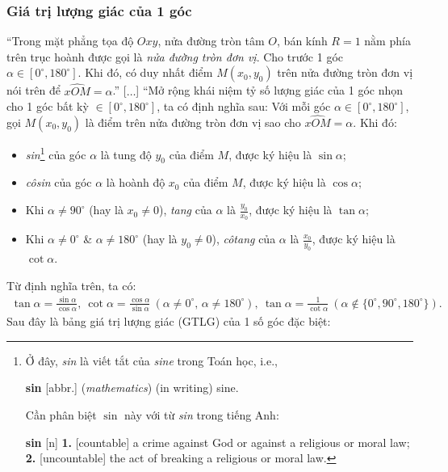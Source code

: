 \documentclass{article}
\numberwithin{equation}{section}
\begin{document}
\subsubsection{Giá trị lượng giác của 1 góc}
``Trong mặt phẳng tọa độ $Oxy$, nửa đường tròn tâm $O$, bán kính $R = 1$ nằm phía trên trục hoành được gọi là \textit{nửa đường tròn đơn vị}. Cho trước 1 góc $\alpha\in[0^\circ,180^\circ]$. Khi đó, có duy nhất điểm $M(x_0,y_0)$ trên nửa đường tròn đơn vị nói trên để $\widehat{xOM} = \alpha$.'' [$\ldots$] ``Mở rộng khái niệm tỷ số lượng giác của 1 góc nhọn cho 1 góc bất kỳ $\in[0^\circ,180^\circ]$, ta có định nghĩa sau: Với mỗi góc $\alpha\in[0^\circ,180^\circ]$, gọi $M(x_0,y_0)$ là điểm trên nửa đường tròn đơn vị sao cho $\widehat{xOM} = \alpha$. Khi đó:
\begin{itemize}
	\item \textit{sin}\footnote{Ở đây, \textit{sin} là viết tắt của \textit{sine} trong Toán học, i.e.,
		
		 \textbf{sin} [abbr.] (\textit{mathematics}) (in writing) sine.
		 
		 Cần phân biệt $\sin$ này với từ \textit{sin} trong tiếng Anh:
	
	\textbf{sin} [n] \textbf{1.} [countable] a crime against God or against a religious or moral law; \textbf{2.} [uncountable] the act of breaking a religious or moral law.} của góc $\alpha$ là tung độ $y_0$ của điểm $M$, được ký hiệu là $\sin\alpha$;
	\item \textit{côsin} của góc $\alpha$ là hoành độ $x_0$ của điểm $M$, được ký hiệu là $\cos\alpha$;
	\item Khi $\alpha\ne 90^\circ$ (hay là $x_0\ne 0$), \textit{tang} của $\alpha$ là $\frac{y_0}{x_0}$, được ký hiệu là $\tan\alpha$;
	\item Khi $\alpha\ne 0^\circ$ \& $\alpha\ne 180^\circ$ (hay là $y_0\ne 0$), \textit{côtang} của $\alpha$ là $\frac{x_0}{y_0}$, được ký hiệu là $\cot\alpha$.
\end{itemize}
Từ định nghĩa trên, ta có:
\begin{align*}
	\tan\alpha = \frac{\sin\alpha}{\cos\alpha},\ \cot\alpha = \frac{\cos\alpha}{\sin\alpha}\ (\alpha\ne 0^\circ,\,\alpha\ne 180^\circ),\ \tan\alpha = \frac{1}{\cot\alpha}\ (\alpha\notin\{0^\circ,90^\circ,180^\circ\}).
\end{align*}
Sau đây là bảng giá trị lượng giác (GTLG) của 1 số góc đặc biệt:
\end{document}
